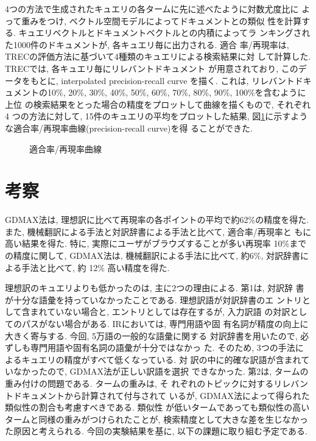 4つの方法で生成されたキュエリの各タームに先に述べたように対数尤度比に
よって重みをつけ, ベクトル空間モデルによってドキュメントとの類似
性を計算する. キュエリベクトルとドキュメントベクトルとの内積によってラ
ンキングされた1000件のドキュメントが, 各キュエリ毎に出力される. 適合
率/再現率は, TRECの評価方法に基づいて4種類のキュエリによる検索結果に対
して計算した\cite{trec}. TRECでは, 各キュエリ毎にリレバントドキュメント
が用意されており, このデータをもとに, interpolated
precision-recall curve を描く. これは, リレバントドキュメントの10\%, 
20\%, 30\%, 40\%, 50\%, 60\%, 70\%, 80\%, 90\%, 100\%を含むように上位
の検索結果をとった場合の精度をプロットして曲線を描くもので, それぞれ4
つの方法に対して, 15件のキュエリの平均をプロットした結果, 
図\ref{result}に示すような適合率/再現率曲線(precision-recall curve)を得
ることができた. 
\vspace*{0.5cm}


\begin{figure}[htbp]
\vspace*{-8mm}
      \begin{center}
 
      \end{center}
\vspace*{-1cm}
       \caption{適合率/再現率曲線}
  \label{result}
\end{figure}
\vspace*{0.5cm}


\section{考察}

GDMAX法は, 理想訳に比べて再現率の各ポイントの平均で約62\%の精度を得た. 
また, 機械翻訳による手法と対訳辞書による手法と比べて, 適合率/再現率と
もに高い結果を得た. 特に, 実際にユーザがブラウズすることが多い再現率
10\%までの精度に関して, GDMAX法は, 機械翻訳による手法に比べて, 約6\%, 
対訳辞書による手法と比べて, 約 12\% 高い精度を得た. 

理想訳のキュエリよりも低かったのは, 主に2つの理由による. 第1は, 対訳辞
書が十分な語彙を持っていなかったことである. 理想訳語が対訳辞書のエ
ントリとして含まれていない場合と, エントリとしては存在するが, 入力訳語
の対訳としてのパスがない場合がある. 
IRにおいては, 専門用語や固
有名詞が精度の向上に大きく寄与する. 今回, 5万語の一般的な語彙に関する
対訳辞書を用いたので, 必ずしも専門用語や固有名詞の語彙が十分ではなかっ
た. そのため, 3つの手法によるキュエリの精度がすべて低くなっている. 対
訳の中に的確な訳語が含まれていなかったので, GDMAX法が正しい訳語を選択
できなかった. 第2は, タームの重み付けの問題である. タームの重みは, そ
れぞれのトピックに対するリレバントドキュメントから計算されて付与されて
いるが, GDMAX法によって得られた類似性の割合も考慮すべきである. 類似性
が低いタームであっても類似性の高いタームと同様の重みがつけられたことが, 
検索精度として大きな差を生じなかった原因と考えられる. 
今回の実験結果を基に, 以下の課題に取り組む予定である. 


